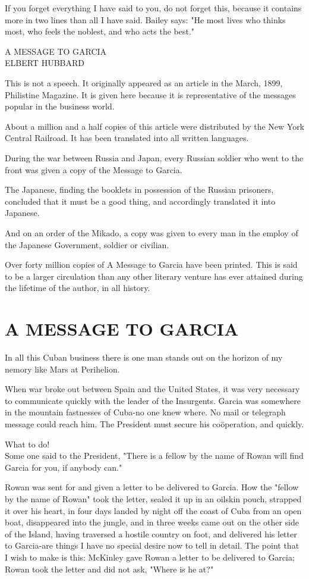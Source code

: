 \documentclass[10pt]{article}
\begin{document}
If you forget everything I have said to you, do not forget this, because it contains more in two lines than all I have said. Bailey says: "He most lives who thinks most, who feels the noblest, and who acts the best."

A MESSAGE TO GARCIA\\
ELBERT HUBBARD

This is not a speech. It originally appeared as an article in the March, 1899, Philistine Magazine. It is given here because it is representative of the messages popular in the business world.

About a million and a half copies of this article were distributed by the New York Central Railroad. It has been translated into all written languages.

During the war between Russia and Japan, every Russian soldier who went to the front was given a copy of the Message to Garcia.

The Japanese, finding the booklets in possession of the Russian prisoners, concluded that it must be a good thing, and accordingly translated it into Japanese.

And on an order of the Mikado, a copy was given to every man in the employ of the Japanese Government, soldier or civilian.

Over forty million copies of A Message to Garcia have been printed. This is said to be a larger circulation than any other literary venture has ever attained during the lifetime of the author, in all history.

\section*{A MESSAGE TO GARCIA }
In all this Cuban business there is one man stands out on the horizon of my nemory like Mars at Perihelion.

When war broke out between Spain and the United States, it was very necessary to communicate quickly with the leader of the Insurgents. Garcia was somewhere in the mountain fastnesses of Cuba-no one knew where. No mail or telegraph message could reach him. The President must secure his coöperation, and quickly.

What to do!\\
Some one said to the President, "There is a fellow by the name of Rowan will find Garcia for you, if anybody can."

Rowan was sent for and given a letter to be delivered to Garcia. How the "fellow by the name of Rowan" took the letter, sealed it up in an oilskin pouch, strapped it over his heart, in four days landed by night off the coast of Cuba from an open boat, disappeared into the jungle, and in three weeks came out on the other side of the Island, having traversed a hostile country on foot, and delivered his letter to Garcia-are things I have no special desire now to tell in detail. The point that I wish to make is this: McKinley gave Rowan a letter to be delivered to Garcia; Rowan took the letter and did not ask, "Where is he at?"
\end{document}
